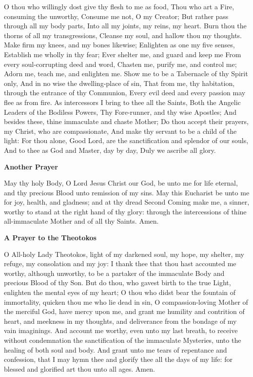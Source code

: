 O thou who willingly dost give thy flesh to me as food, Thou who art a Fire, consuming the unworthy, Consume me not, O my Creator; But rather pass through all my body parts, Into all my joints, my reins, my heart. Burn thou the thorns of all my transgressions, Cleanse my soul, and hallow thou my thoughts. Make firm my knees, and my bones likewise; Enlighten as one my five senses, Establish me wholly in thy fear; Ever shelter me, and guard and keep me From every soul-corrupting deed and word, Chasten me, purify me, and control me; Adorn me, teach me, and enlighten me. Show me to be a Tabernacle of thy Spirit only, And in no wise the dwelling-place of sin, That from me, thy habitation, through the entrance of thy Communion, Every evil deed and every passion may flee as from fire. As intercessors I bring to thee all the Saints, Both the Angelic Leaders of the Bodiless Powers, Thy Fore-runner, and thy wise Apostles; And besides these, thine immaculate and chaste Mother; Do thou accept their prayers, my Christ, who are compassionate, And make thy servant to be a child of the light: For thou alone, Good Lord, are the sanctification and splendor of our souls, And to thee as God and Master, day by day, Duly we ascribe all glory.


\begin{center}
	\textbf{Another Prayer}
\end{center}

May thy holy Body, O Lord Jesus Christ our God, be unto me for life eternal, and thy precious Blood unto remission of my sins. May this Eucharist be unto me for joy, health, and gladness; and at thy dread Second Coming make me, a sinner, worthy to stand at the right hand of thy glory: through the intercessions of thine all-immaculate Mother and of all thy Saints.  Amen.

\begin{center}
	\textbf{A Prayer to the Theotokos}
\end{center}

O  All-holy Lady Theotokos, light of my darkened soul, my hope, my shelter, my refuge, my consolation and my joy: I thank thee that thou hast accounted me worthy, although unworthy, to be a partaker of the immaculate Body and precious Blood of thy Son. But do thou, who gavest birth to the true Light, enlighten the mental eyes of my heart; O thou who didst bear the fountain of immortality, quicken thou me who lie dead in sin, O compassion-loving Mother of the merciful God, have mercy upon me, and grant me humility and contrition of heart, and meekness in my thoughts, and deliverance from the bondage of my vain imaginings. And account me worthy, even unto my last breath, to receive without condemnation the sanctification of the immaculate Mysteries, unto the healing of both soul and body. And grant unto me tears of repentance and confession, that I may hymn thee and glorify thee all the days of my life: for blessed and glorified art thou unto all ages.  Amen.